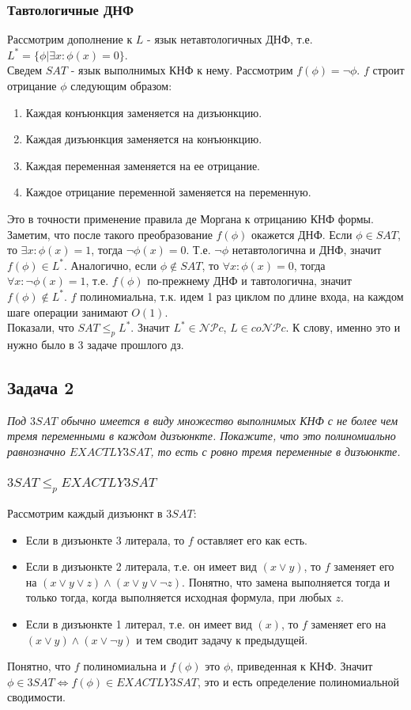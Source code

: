 \documentclass{article}
\begin{document}
\subsubsection*{Тавтологичные ДНФ}
Рассмотрим дополнение к $L$ - язык нетавтологичных ДНФ, т.е. $L^* = \{\phi | \exists x : \phi(x) = 0\}$.\\
Сведем $SAT$ - язык выполнимых КНФ к нему. Рассмотрим $f(\phi) = \neg \phi$. $f$ строит отрицание $\phi$ следующим образом:
\begin{enumerate}
	\item Каждая конъюнкция заменяется на дизъюнкцию.
	\item Каждая дизъюнкция заменяется на конъюнкцию.
	\item Каждая переменная заменяется на ее отрицание.
	\item Каждое отрицание переменной заменяется на переменную.
\end{enumerate} 
Это в точности применение правила де Моргана к отрицанию КНФ формы. Заметим, что после такого преобразование $f(\phi)$ окажется ДНФ. Если $\phi \in SAT$, то $\exists x: \phi(x)=1$, тогда $\neg \phi(x) = 0$. Т.е. $\neg \phi$ нетавтологична и ДНФ, значит $f(\phi) \in L^*$. Аналогично, если $\phi \notin SAT$, то $\forall x : \phi(x) = 0$, тогда $\forall x : \neg \phi(x) = 1$, т.е. $f(\phi)$ по-прежнему ДНФ и тавтологична, значит $f(\phi) \notin L^*$. $f$ полиномиальна, т.к. идем 1 раз циклом по длине входа, на каждом шаге операции занимают $O(1)$.\\
Показали, что $SAT \leq_p L^*$. Значит $L^* \in \mathcal{NP}c$, $L \in co\mathcal{NP}c$. К слову, именно это и нужно было в 3 задаче прошлого дз.
\subsection*{Задача 2}
\textit{Под $3SAT$ обычно имеется в виду множество выполнимых КНФ с не более чем тремя переменными в каждом дизъюнкте. Покажите, что это полиномиально равнозначно $EXACTLY3SAT$, то есть с ровно тремя переменные в дизъюнкте.}\\
\subsubsection*{$3SAT \leq_p EXACTLY3SAT$}
Рассмотрим каждый дизъюнкт в $3SAT$:
\begin{itemize}
	\item Если в дизъюнкте 3 литерала, то $f$ оставляет его как есть.
	\item Если в дизъюнкте 2 литерала, т.е. он имеет вид $(x \vee y)$, то  $f$ заменяет его на $(x \vee y \vee z) \wedge (x \vee y \vee \neg z)$. Понятно, что замена выполняется тогда и только тогда, когда выполняется исходная формула, при любых $z$.
	\item Если в дизъюнкте 1 литерал, т.е. он имеет вид $(x)$, то $f$ заменяет его на $(x \vee y) \wedge (x \vee \neg y)$ и тем сводит задачу к предыдущей.
\end{itemize}
Понятно, что $f$ полиномиальна и $f(\phi)$ это $\phi$, приведенная к КНФ. Значит $\phi \in 3SAT \Leftrightarrow f(\phi) \in EXACTLY3SAT$, это и есть определение полиномиальной сводимости. 
\end{document}
